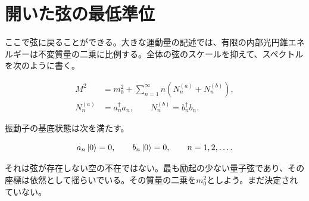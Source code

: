 \begin{classroomqa}
\end{classroomqa}

\begin{classroomqa}
\end{classroomqa}

\section{開いた弦の最低準位}

ここで弦に戻ることができる。大きな運動量の記述では、有限の内部光円錐エネルギーは不変質量の二乗に比例する。全体の弦のスケールを抑えて、スペクトルを次のように書く。

\begin{equation}
  \begin{aligned}
    M^2
    &=m_0^2
      +\sum_{n=1}^{\infty}n
       \left(N_n^{(a)}+N_n^{(b)}\right),\\
    N_n^{(a)}&=a_n^\dagger a_n,
    \qquad
    N_n^{(b)}=b_n^\dagger b_n.
  \end{aligned}
  \label{eq:l03-open-spectrum}
\end{equation}

振動子の基底状態は次を満たす。

\begin{equation}
  a_n\left\lvert0\right\rangle=0,
  \qquad
  b_n\left\lvert0\right\rangle=0,
  \qquad n=1,2,\ldots .
  \label{eq:l03-ground-annihilation}
\end{equation}

それは弦が存在しない空の不在ではない。最も励起の少ない量子弦であり、その座標は依然として揺らいでいる。その質量の二乗を\(m_0^2\)としよう。まだ決定されていない。


